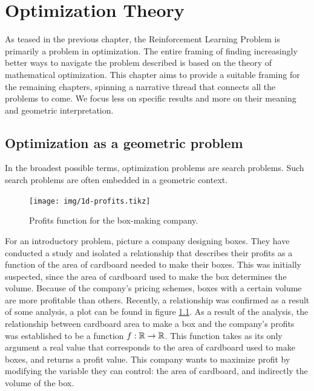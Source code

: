 \chapter{Optimization Theory}
\label{chapter:OptimizationTheory}

As teased in the previous chapter, the Reinforcement Learning Problem
is primarily a problem in optimization. The entire framing of finding
increasingly better ways to navigate the problem described is based on the theory
of mathematical optimization. This chapter aims to provide a suitable framing
for the remaining chapters, spinning a narrative thread that connects all the
problems to come. We focus less on specific results and more on their meaning
and geometric interpretation.

\section{Optimization as a geometric problem}

In the broadest possible terms, optimization problems are search problems. Such
search problems are often embedded in a geometric context.

\begin{figure}
   \centering
   \texttt{[image: img/1d-profits.tikz]} 
   \caption{Profits function for the box-making company.}
   \label{fig:1d-profits}
\end{figure}

For an introductory problem, picture a company designing boxes. They have
conducted a study and isolated a relationship that describes their profits as a
function of the area of cardboard needed to make their boxes. This was initially
suspected, since the area of cardboard used to make the box determines the
volume.  Because of the company's pricing schemes, boxes with a certain volume
are more profitable than others. Recently, a relationship was confirmed as a
result of some analysis, a plot can be found in figure \ref{fig:1d-profits}. As
a result of the analysis, the relationship between cardboard area to make a box
and the company's profits was established to be a function $f: \mathbb{R} \to \mathbb{R}$. This
function takes as its only argument a real value that corresponds to the area of
cardboard used to make boxes, and returns a profit value. This company wants to
maximize profit by modifying the variable they can control: the area of
cardboard, and indirectly the volume of the box.

